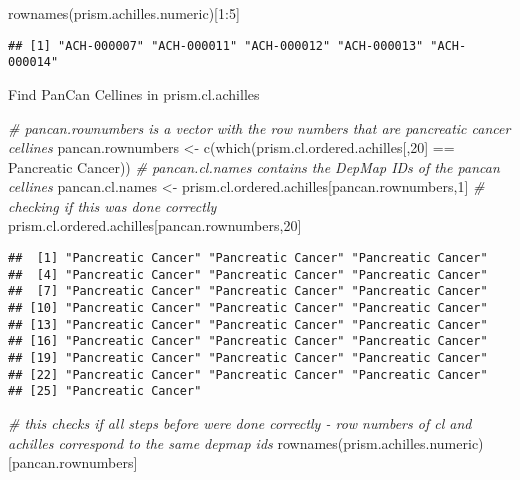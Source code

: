 \documentclass[
]{article}
\newenvironment{Shaded}{\begin{snugshade}}{\end{snugshade}}
\newcommand{\CommentTok}[1]{\textcolor[rgb]{0.56,0.35,0.01}{\textit{#1}}}
\newcommand{\DecValTok}[1]{\textcolor[rgb]{0.00,0.00,0.81}{#1}}
\newcommand{\FunctionTok}[1]{\textcolor[rgb]{0.00,0.00,0.00}{#1}}
\newcommand{\NormalTok}[1]{#1}
\newcommand{\OtherTok}[1]{\textcolor[rgb]{0.56,0.35,0.01}{#1}}
\newcommand{\SpecialCharTok}[1]{\textcolor[rgb]{0.00,0.00,0.00}{#1}}
\newcommand{\StringTok}[1]{\textcolor[rgb]{0.31,0.60,0.02}{#1}}
\begin{document}
\begin{Shaded}
\begin{Highlighting}[]
\FunctionTok{rownames}\NormalTok{(prism.achilles.numeric)[}\DecValTok{1}\SpecialCharTok{:}\DecValTok{5}\NormalTok{]}
\end{Highlighting}
\end{Shaded}

\begin{verbatim}
## [1] "ACH-000007" "ACH-000011" "ACH-000012" "ACH-000013" "ACH-000014"
\end{verbatim}

Find PanCan Cellines in prism.cl.achilles

\begin{Shaded}
\begin{Highlighting}[]
\CommentTok{\# pancan.rownumbers is a vector with the row numbers that are pancreatic cancer cellines}
\NormalTok{pancan.rownumbers }\OtherTok{\textless{}{-}} \FunctionTok{c}\NormalTok{(}\FunctionTok{which}\NormalTok{(prism.cl.ordered.achilles[,}\DecValTok{20}\NormalTok{] }\SpecialCharTok{==} \StringTok{\textquotesingle{}Pancreatic Cancer\textquotesingle{}}\NormalTok{))}
\CommentTok{\# pancan.cl.names contains the DepMap IDs of the pancan cellines}
\NormalTok{pancan.cl.names }\OtherTok{\textless{}{-}}\NormalTok{ prism.cl.ordered.achilles[pancan.rownumbers,}\DecValTok{1}\NormalTok{]}
\CommentTok{\# checking if this was done correctly}
\NormalTok{prism.cl.ordered.achilles[pancan.rownumbers,}\DecValTok{20}\NormalTok{]}
\end{Highlighting}
\end{Shaded}

\begin{verbatim}
##  [1] "Pancreatic Cancer" "Pancreatic Cancer" "Pancreatic Cancer"
##  [4] "Pancreatic Cancer" "Pancreatic Cancer" "Pancreatic Cancer"
##  [7] "Pancreatic Cancer" "Pancreatic Cancer" "Pancreatic Cancer"
## [10] "Pancreatic Cancer" "Pancreatic Cancer" "Pancreatic Cancer"
## [13] "Pancreatic Cancer" "Pancreatic Cancer" "Pancreatic Cancer"
## [16] "Pancreatic Cancer" "Pancreatic Cancer" "Pancreatic Cancer"
## [19] "Pancreatic Cancer" "Pancreatic Cancer" "Pancreatic Cancer"
## [22] "Pancreatic Cancer" "Pancreatic Cancer" "Pancreatic Cancer"
## [25] "Pancreatic Cancer"
\end{verbatim}

\begin{Shaded}
\begin{Highlighting}[]
\CommentTok{\# this checks if all steps before were done correctly {-} row numbers of cl and achilles correspond to the same depmap ids}
\FunctionTok{rownames}\NormalTok{(prism.achilles.numeric)[pancan.rownumbers]}
\end{Highlighting}
\end{Shaded}
\end{document}
